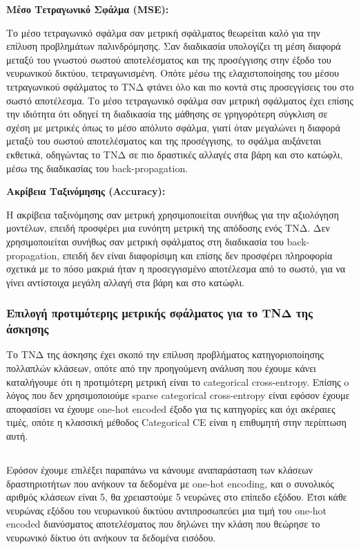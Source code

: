 \documentclass[12pt,a4paper]{article}
\begin{document}
\textbf{Μέσο Τετραγωνικό Σφάλμα (MSE):}

Το μέσο τετραγωνικό σφάλμα σαν μετρική σφάλματος θεωρείται καλό για την επίλυση προβλημάτων παλινδρόμησης. Σαν διαδικασία υπολογίζει τη μέση διαφορά μεταξύ του γνωστού σωστού αποτελέσματος και της προσέγγισης στην έξοδο του νευρωνικού δικτύου, τετραγωνισμένη. Οπότε μέσω της ελαχιστοποίησης του μέσου τετραγωνικού σφάλματος το ΤΝΔ φτάνει όλο και πιο κοντά στις προσεγγίσεις του στο σωστό αποτέλεσμα. Το μέσο τετραγωνικό σφάλμα σαν μετρική σφάλματος έχει επίσης την ιδιότητα ότι οδηγεί τη διαδικασία της μάθησης σε γρηγορότερη σύγκλιση σε σχέση με μετρικές όπως το μέσο απόλυτο σφάλμα, γιατί όταν μεγαλώνει η διαφορά μεταξύ του σωστού αποτελέσματος και της προσέγγισης, το σφάλμα αυξάνεται εκθετικά, οδηγώντας το ΤΝΔ σε πιο δραστικές αλλαγές στα βάρη και στο κατώφλι, μέσω της διαδικασίας του back-propagation.

\textbf{Ακρίβεια Ταξινόμησης (Accuracy):}

Η ακρίβεια ταξινόμησης σαν μετρική χρησιμοποιείται συνήθως για την αξιολόγηση μοντέλων, επειδή προσφέρει μια ευνόητη μετρική της απόδοσης ενός ΤΝΔ. Δεν χρησιμοποιείται συνήθως σαν μετρική σφάλματος στη διαδικασία του back-propagation, επειδή δεν είναι διαφορίσιμη και επίσης δεν προσφέρει πληροφορία σχετικά με το πόσο μακριά ήταν η προσεγγισμένο αποτέλεσμα από το σωστό, για να γίνει αντίστοιχα μεγάλη αλλαγή στα βάρη και στο κατώφλι.

\subsubsection{Επιλογή προτιμότερης μετρικής σφάλματος για το ΤΝΔ της άσκησης}

Το ΤΝΔ της άσκησης έχει σκοπό την επίλυση προβλήματος κατηγοριοποίησης πολλαπλών κλάσεων, οπότε από την προηγούμενη ανάλυση που έχουμε κάνει καταλήγουμε ότι η προτιμότερη μετρική είναι το categorical cross-entropy. Επίσης o λόγος που δεν χρησιμοποιούμε sparse categorical cross-entropy είναι εφόσον έχουμε αποφασίσει να έχουμε one-hot encoded έξοδο για τις κατηγορίες και όχι ακέραιες τιμές, οπότε η κλασσική μέθοδος Categorical CE είναι η επιθυμητή στην περίπτωση αυτή. 

\subsection{}

Εφόσον έχουμε επιλέξει παραπάνω να κάνουμε αναπαράσταση των κλάσεων δραστηριοτήτων που ανήκουν τα δεδομένα με one-hot encoding, και ο συνολικός αριθμός κλάσεων είναι 5, θα χρειαστούμε 5 νευρώνες στο επίπεδο εξόδου. Έτσι κάθε νευρώνας εξόδου του νευρωνικού δικτύου αντιπροσωπεύει μια τιμή του one-hot encoded διανύσματος αποτελέσματος που δηλώνει την κλάση που θεώρησε το νευρωνικό δίκτυο ότι ανήκουν τα δεδομένα εισόδου.
\end{document}
